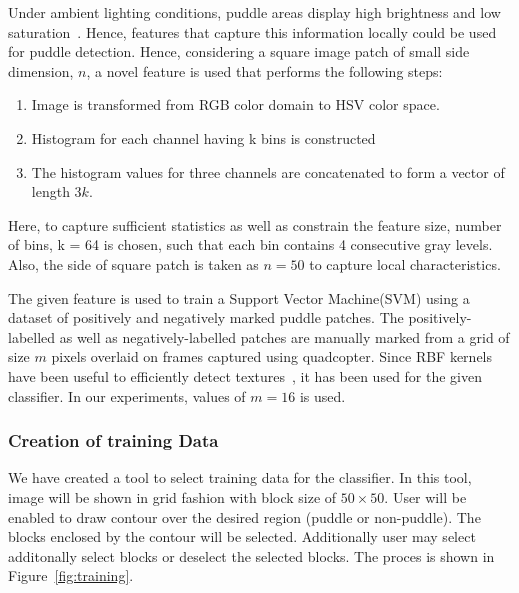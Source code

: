 \documentclass[times,10pt,twocolumn,letterpaper]{article}
\begin{document}
Under ambient lighting conditions, puddle areas display high brightness and low
saturation~\cite{rankin04}. Hence, features that capture this information locally
could be used for puddle detection. Hence, considering a square image patch of
small side dimension, $n$, a novel feature is used that performs the following
steps:
\begin{enumerate}
\item Image is transformed from RGB color domain to HSV color space.
\item Histogram for each channel having k bins is constructed
\item The histogram values for three channels are concatenated to form a vector
of length $3k$.
\end{enumerate}
 
Here, to capture sufficient statistics as well as constrain the feature size,
number of bins, k = 64 is chosen, such that each bin contains 4 consecutive gray
levels. Also, the side of square patch is taken as $n = 50$ to capture local
characteristics.

The given feature is used to train a Support Vector Machine(SVM) using a
dataset of positively and negatively marked puddle patches. The
positively-labelled as well as negatively-labelled patches are manually marked
from a grid of size $m$ pixels overlaid on frames captured using quadcopter.
Since RBF kernels have been useful to efficiently detect
textures~\cite{Chapelle99}, it has been used for the given classifier. In our
experiments, values of $m = 16$ is used.

\subsubsection{Creation of training Data}
We have created a tool to select training data for the classifier. In this tool,
image will be shown in grid fashion with block size of $50  \times 50$. 
User will be enabled to draw contour over the desired region (puddle or
non-puddle). The blocks enclosed by the contour will be selected. Additionally
user may select additonally select blocks or deselect the selected blocks. The
proces is shown in Figure~\ref{fig:training}.
\end{document}
